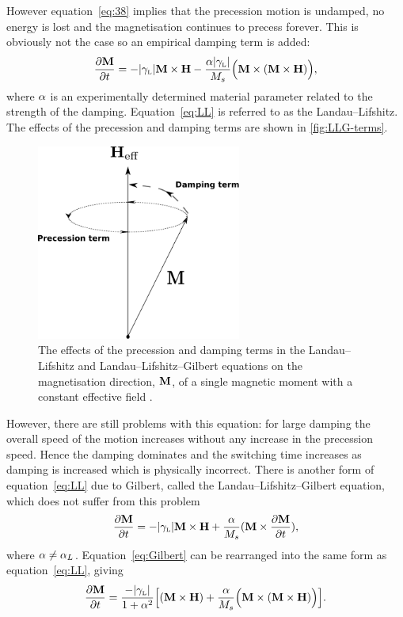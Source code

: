 However equation~\eqref{eq:38} implies that the precession motion is undamped, \ie no energy is lost and the magnetisation continues to precess forever. This is obviously not the case so an empirical damping term is added:
\begin{equation}
  \label{eq:LL}
  \frac{\partial \mathbf{M}}{\partial t} = - {\left|{\gamma_{\text{\tiny{L}}}} \right|} \mathbf{M} \times \mathbf{H} - \frac{\alpha {\left|{\gamma_{\text{\tiny{L}}}} \right|}}{M_s} \Big( \mathbf{M} \times (\mathbf{M} \times \mathbf{H}) \Big),
\end{equation}
where $\alpha$ is an experimentally determined material parameter related to the strength of the damping. Equation~\eqref{eq:LL} is referred to as the Landau--Lifshitz.\cite{Landau1935} The effects of the precession and damping terms are shown in \autoref{fig:LLG-terms}.

\begin{figure}[ht!]
  \centering
  \includegraphics[width=0.6\textwidth]{./images/LLG-terms}
  \caption{The effects of the precession and damping terms in the Landau--Lifshitz and Landau--Lifshitz--Gilbert equations on the magnetisation direction, $\mathbf{M}$, of a single magnetic moment with a constant effective field
.}
  \label{fig:LLG-terms}
\end{figure}

However, there are still problems with this equation: for large damping the overall speed of the
motion increases without any increase in the precession speed. Hence the damping dominates and the switching time increases as damping is increased which is physically incorrect.\cite{Mallinson1987} There is another form of equation~\eqref{eq:LL} due to Gilbert\cite{Gilbert2004}, called the Landau--Lifshitz--Gilbert equation, which does not suffer from this problem
\begin{equation}
  \label{eq:Gilbert}
  \frac{\partial \mathbf{M}}{\partial t} = - {\left|{\gamma_{\text{\tiny{L}}}} \right|} \mathbf{M} \times \mathbf{H} + \frac{\alpha}{M_s} (\mathbf{M} \times \frac{\partial \mathbf{M}}{\partial t}),
\end{equation}
where $\alpha \neq \alpha_L$. Equation~\eqref{eq:Gilbert} can be rearranged into the same form as equation~\eqref{eq:LL}, giving
\begin{equation}
  \label{eq:LLG}
  \frac{\partial \mathbf{M}}{\partial t} = \frac{-{\left|{\gamma_{\text{\tiny{L}}}} \right|}}{1 + \alpha^2} \Big[ (\mathbf{M} \times \mathbf{H}) + \frac{\alpha}{M_s} \Big(\mathbf{M} \times (\mathbf{M} \times \mathbf{H}) \Big) \Big].
\end{equation}

